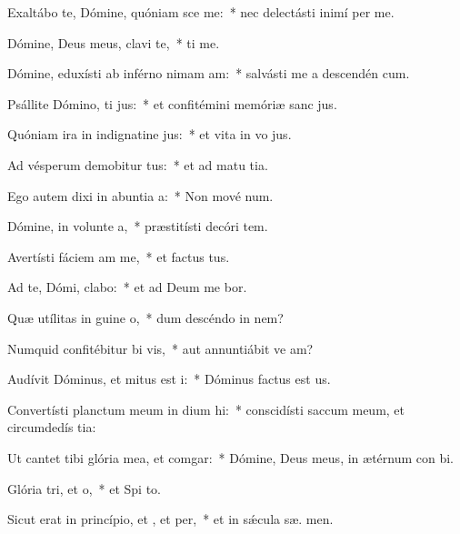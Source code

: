 \item Exaltábo te, Dómine, quóniam sce me:~* nec delectásti inimí  per me.
\item Dómine, Deus meus, clavi  te,~*  ti me.
\item Dómine, eduxísti ab inférno nimam am:~* salvásti me a descendén  cum.
\item Psállite Dómino, ti jus:~* et confitémini memóriæ sanc jus.
\item Quóniam ira in indignatine jus:~* et vita in vo jus.
\item Ad vésperum demobitur tus:~* et ad matu tia.
\item Ego autem dixi in abuntia a:~* Non mové  num.
\item Dómine, in volunte a,~* præstitísti decóri  tem.
\item Avertísti fáciem am  me,~* et factus  tus.
\item Ad te, Dómi, clabo:~* et ad Deum me bor.
\item Quæ utílitas in guine o,~* dum descéndo in nem?
\item Numquid confitébitur bi vis,~* aut annuntiábit ve am?
\item Audívit Dóminus, et mitus est i:~* Dóminus factus est  us.
\item Convertísti planctum meum in dium hi:~* conscidísti saccum meum, et circumdedís  tia:
\item Ut cantet tibi glória mea, et  comgar:~* Dómine, Deus meus, in ætérnum con bi.
\item Glória tri, et o,~* et Spi to.
\item Sicut erat in princípio, et , et per,~* et in sǽcula sæ. men.
